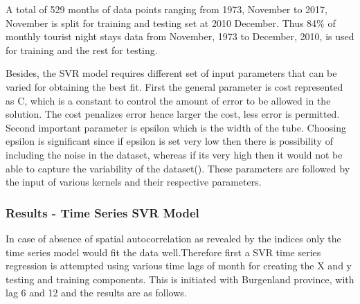 \documentclass[a4paper,reqno,]{article}
\begin{document}
\noindent
A total of 529 months of data points  ranging from 1973, November to 2017, November is split for training and testing set at 2010 December. Thus 84\% of monthly tourist night stays data from November, 1973 to December, 2010, is used for training and the rest for testing. 

\noindent
Besides, the SVR model requires different set of input parameters that can be varied for obtaining the best fit. First the general parameter is cost represented as C, which is a constant to control the amount of error to be allowed in the solution. The cost penalizes error hence larger the cost, less error is permitted. Second important parameter is epsilon which is the width of the tube. Choosing epsilon is significant since if epsilon is set very low then there is possibility of including the noise in the dataset, whereas if its very high then it would not be able to capture the variability of the dataset(\cite{e}). These parameters are followed by the input of various kernels and their respective parameters.
\subsubsection{Results - Time Series SVR Model}
In case of absence of spatial autocorrelation as revealed by the indices only the time series model would fit the data well.Therefore first a SVR time series regression is attempted using various time lags of month for creating the X and y testing and training components. This is initiated with Burgenland province, with lag  6 and 12 and the results are as follows. 
\end{document}
